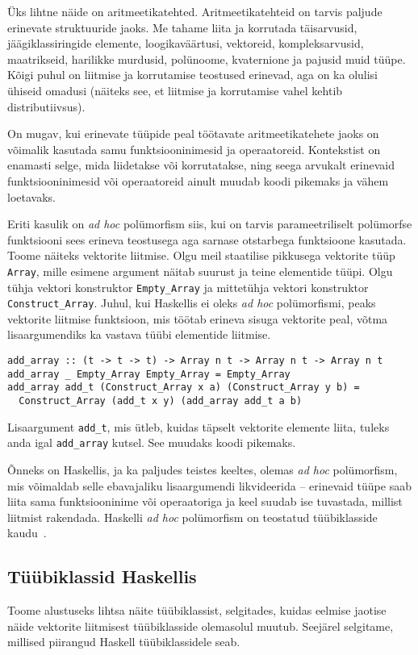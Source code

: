 \documentclass[12pt]{article}
\begin{document}
      Üks lihtne näide on aritmeetikatehted. Aritmeetikatehteid on tarvis paljude erinevate struktuuride jaoks. Me tahame liita ja korrutada täisarvusid, jäägiklassiringide elemente, loogikaväärtusi, vektoreid, kompleksarvusid, maatrikseid, harilikke murdusid, polünoome, kvaternione ja pajusid muid tüüpe. Kõigi puhul on liitmise ja korrutamise teostused erinevad, aga on ka olulisi ühiseid omadusi (näiteks see, et liitmise ja korrutamise vahel kehtib distributiivsus).

      On mugav, kui erinevate tüüpide peal töötavate aritmeetikatehete jaoks on võimalik kasutada samu funktsiooninimesid ja operaatoreid. Kontekstist on enamasti selge, mida liidetakse või korrutatakse, ning seega arvukalt erinevaid funktsiooninimesid või operaatoreid ainult muudab koodi pikemaks ja vähem loetavaks.

      Eriti kasulik on \textit{ad hoc} polümorfism siis, kui on tarvis parameetriliselt polümorfse funktsiooni sees erineva teostusega aga sarnase otstarbega funktsioone kasutada. Toome näiteks vektorite liitmise. Olgu meil staatilise pikkusega vektorite tüüp \verb!Array!, mille esimene argument näitab suurust ja teine elementide tüüpi. Olgu tühja vektori konstruktor \verb!Empty_Array! ja mittetühja vektori konstruktor \verb!Construct_Array!. Juhul, kui Haskellis ei oleks \textit{ad hoc} polümorfismi, peaks vektorite liitmise funktsioon, mis töötab erineva sisuga vektorite peal, võtma lisaargumendiks ka vastava tüübi elementide liitmise.

      \begin{verbatim}add_array :: (t -> t -> t) -> Array n t -> Array n t -> Array n t
add_array _ Empty_Array Empty_Array = Empty_Array
add_array add_t (Construct_Array x a) (Construct_Array y b) =
  Construct_Array (add_t x y) (add_array add_t a b)\end{verbatim}

    Lisaargument \verb!add_t!, mis ütleb, kuidas täpselt vektorite elemente liita, tuleks anda igal \verb!add_array! kutsel. See muudaks koodi pikemaks.

    Õnneks on Haskellis, ja ka paljudes teistes keeltes, olemas \textit{ad hoc} polümorfism, mis võimaldab selle ebavajaliku lisaargumendi likvideerida -- erinevaid tüüpe saab liita sama funktsiooninime või operaatoriga ja keel suudab ise tuvastada, millist liitmist rakendada. Haskelli \textit{ad hoc} polümorfism on teostatud tüübiklasside kaudu~\cite{How}.
    \subsection{Tüübiklassid Haskellis}\label{haskklass}
      Toome alustuseks lihtsa näite tüübiklassist, selgitades, kuidas eelmise jaotise näide vektorite liitmisest tüübiklasside olemasolul muutub. Seejärel selgitame, millised piirangud Haskell tüübiklassidele seab.
\end{document}
